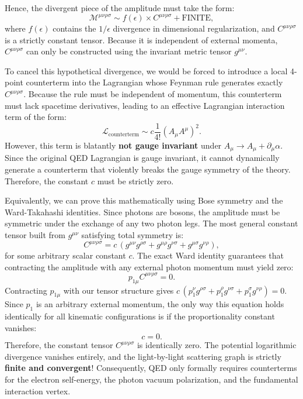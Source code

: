 Hence, the divergent piece of the amplitude must take the form:
\[
    \mathcal{M}^{\mu\nu\rho\sigma} \sim f(\epsilon) \times C^{\mu\nu\rho\sigma} + \text{FINITE},
\]
where $f(\epsilon)$ contains the $1/\epsilon$ divergence in dimensional regularization, and $C^{\mu\nu\rho\sigma}$ is a strictly constant tensor. Because it is independent of external momenta, $C^{\mu\nu\rho\sigma}$ can only be constructed using the invariant metric tensor $g^{\mu\nu}$.

To cancel this hypothetical divergence, we would be forced to introduce a local 4-point counterterm into the Lagrangian whose Feynman rule generates exactly $C^{\mu\nu\rho\sigma}$. Because the rule must be independent of momentum, this counterterm must lack spacetime derivatives, leading to an effective Lagrangian interaction term of the form:
\[
    \mathcal{L}_{\text{counterterm}} \sim c \frac{1}{4!} (A_\mu A^\mu)^2.
\]
However, this term is blatantly \textbf{not gauge invariant} under $A_\mu \to A_\mu + \partial_\mu \alpha$. Since the original QED Lagrangian is gauge invariant, it cannot dynamically generate a counterterm that violently breaks the gauge symmetry of the theory. Therefore, the constant $c$ must be strictly zero.

Equivalently, we can prove this mathematically using Bose symmetry and the Ward-Takahashi identities. Since photons are bosons, the amplitude must be symmetric under the exchange of any two photon legs. The most general constant tensor built from $g^{\mu\nu}$ satisfying total symmetry is:
\[
    C^{\mu\nu\rho\sigma} = c \, (g^{\mu\nu}g^{\rho\sigma} + g^{\mu\rho}g^{\nu\sigma} + g^{\mu\sigma}g^{\nu\rho}),
\]
for some arbitrary scalar constant $c$. The exact Ward identity guarantees that contracting the amplitude with any external photon momentum must yield zero:
\[
    p_{1\mu} C^{\mu\nu\rho\sigma} = 0.
\]
Contracting $p_{1\mu}$ with our tensor structure gives $c \, (p_1^\nu g^{\rho\sigma} + p_1^\rho g^{\nu\sigma} + p_1^\sigma g^{\nu\rho}) = 0$. Since $p_1$ is an arbitrary external momentum, the only way this equation holds identically for all kinematic configurations is if the proportionality constant vanishes:
\[
    c = 0.
\]
Therefore, the constant tensor $C^{\mu\nu\rho\sigma}$ is identically zero. The potential logarithmic divergence vanishes entirely, and the light-by-light scattering graph is strictly \textbf{finite and convergent}! Consequently, QED only formally requires counterterms for the electron self-energy, the photon vacuum polarization, and the fundamental interaction vertex.

